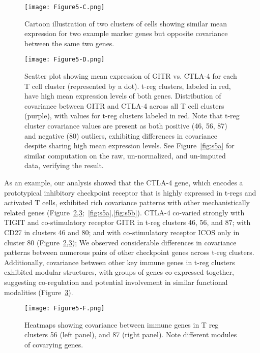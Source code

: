 \begin{figure}
\centering
\texttt{[image: Figure5-C.png]}
\caption{Cartoon illustration of two clusters of cells showing similar mean expression for two example marker genes but opposite covariance between the same two genes.
}
\label{fig:5c}
\end{figure}

\begin{figure}
\centering
\texttt{[image: Figure5-D.png]}
\caption{Scatter plot showing mean expression of GITR vs. CTLA-4 for each T cell cluster (represented by a dot).
  t-reg clusters, labeled in red, have high mean expression levels of both genes.
Distribution of covariance between GITR and CTLA-4 across all T cell clusters (purple), with values for t-reg clusters labeled in red.
Note that t-reg cluster covariance values are present as both positive (46, 56, 87) and negative (80) outliers, exhibiting differences in covariance despite sharing high mean expression levels.
See Figure~\ref{fig:s5a} for similar computation on the raw, un-normalized, and un-imputed data, verifying the result.
}
\label{fig:5d}
\end{figure}

As an example, our analysis showed that the CTLA-4 gene, which encodes a prototypical inhibitory checkpoint receptor that is highly expressed in t-regs and activated T cells, exhibited rich covariance patterns with other mechanistically related genes (Figure~\ref{fig:5d},\ref{fig:5f};~\ref{fig:s5a},\ref{fig:s5b}).
CTLA-4 co-varied strongly with TIGIT and co-stimulatory receptor GITR in t-reg clusters 46, 56, and 87; with CD27 in clusters 46 and 80; and with co-stimulatory receptor ICOS only in cluster 80 (Figure~\ref{fig:5d},\ref{fig:5f}); We observed considerable differences in covariance patterns between numerous pairs of other checkpoint genes across t-reg clusters.
Additionally, covariance between other key immune genes in t-reg clusters exhibited modular structures, with groups of genes co-expressed together, suggesting co-regulation and potential involvement in similar functional modalities (Figure~\ref{fig:5f}).

\begin{figure}
\centering
\texttt{[image: Figure5-F.png]}
\caption{Heatmaps showing covariance between immune genes in T reg clusters 56 (left panel), and 87 (right panel). Note different modules of covarying genes.
}
\label{fig:5f}
\end{figure}


